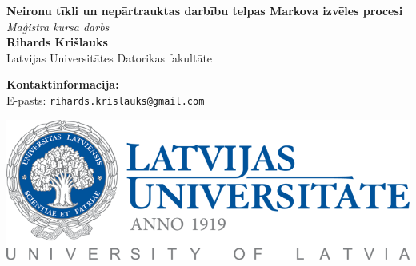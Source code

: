 \documentclass[a0,landscape]{a0poster}
\numberwithin{equation}{section}
\theoremstyle{definition}
\theoremstyle{plain}
\begin{document}


\begin{minipage}[b]{0.55\linewidth}
\veryHuge \color{NavyBlue} \textbf{Neironu tīkli un nepārtrauktas darbību telpas Markova izvēles procesi} \color{Black}\\ %
\Huge\textit{Maģistra kursa darbs}\\[1cm] %
\huge \textbf{Rihards Krišlauks}\\ %
\huge Latvijas Universitātes Datorikas fakultāte\\ %
\end{minipage}
%
\begin{minipage}[b]{0.25\linewidth}
\color{DarkSlateGray}\Large \textbf{Kontaktinformācija:}\\
E-pasts: \texttt{rihards.krislauks@gmail.com}\\ %
\end{minipage}
%
\begin{minipage}[b]{0.19\linewidth}
\includegraphics[width=20cm]{lu-logo-full.png} %
\end{minipage}

\vspace{1cm} %

\end{document}
